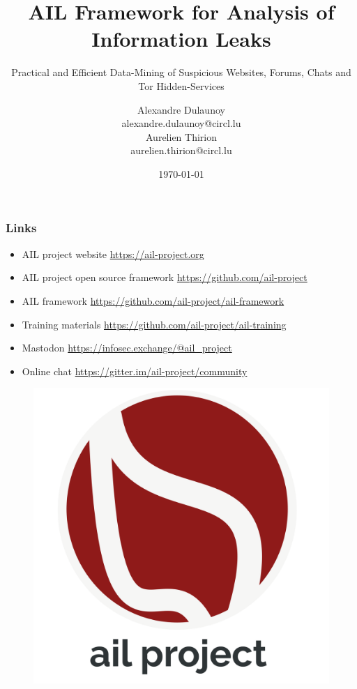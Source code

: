 \documentclass[aspectratio=169]{beamer}
\author{\Large{Alexandre Dulaunoy}\\ \scriptsize{alexandre.dulaunoy@circl.lu}\\ \large{Aurelien Thirion}\\ \scriptsize{aurelien.thirion@circl.lu}\\ %
}
\title{AIL Framework for Analysis of Information Leaks}
\subtitle{Practical and Efficient Data-Mining of Suspicious Websites, Forums, Chats and Tor Hidden-Services}
\institute{info@circl.lu}
\date{\today}
\begin{document}
\begin{frame}[t,plain]
\titlepage
\end{frame}


\begin{frame}
\frametitle{Links}
    \begin{itemize}
        \item AIL project website \url{https://ail-project.org}
        \item AIL project open source framework \url{https://github.com/ail-project}
        \item AIL framework \url{https://github.com/ail-project/ail-framework}
        \item Training materials \url{https://github.com/ail-project/ail-training}
	\item Mastodon \url{https://infosec.exchange/@ail_project}
        \item Online chat \url{https://gitter.im/ail-project/community}
    \end{itemize}
    \begin{figure}
        \includegraphics[scale=0.1, angle=0]{images/ail-project.png}
    \end{figure}
\end{frame}
\end{document}
